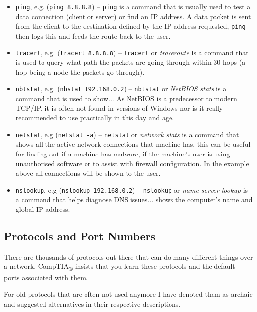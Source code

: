 \documentclass{article}
\begin{document}
\begin{itemize}
    \item \texttt{ping}, e.g. (\texttt{ping 8.8.8.8}) -- \texttt{ping} is a command that is usually used to test a data connection (client or server) or find an IP address. A data packet is sent from the client to the destination defined by the IP address requested, \texttt{ping} then logs this and feeds the route back to the user.
    \item \texttt{tracert}, e.g. (\texttt{tracert 8.8.8.8}) -- \texttt{tracert} or \textit{traceroute} is a command that is used to query what path the packets are going through within 30 hops (a hop being a node the packets go through).
    \item \texttt{nbtstat}, e.g. (\texttt{nbstat 192.168.0.2}) -- \texttt{nbtstat} or \textit{NetBIOS stats} is a command that is used to show... As NetBIOS is a predecessor to modern TCP/IP, it is often not found in versions of Windows nor is it really recommended to use practically in this day and age.
    \item \texttt{netstat}, e.g (\texttt{netstat -a}) -- \texttt{netstat} or \textit{network stats} is a command that shows all the active network connections that machine has, this can be useful for finding out if a machine has malware, if the machine's user is using unauthorised software or to assist with firewall configuration. In the example above all connections will be shown to the user.
    \item \texttt{nslookup}, e.g (\texttt{nslookup 192.168.0.2}) -- \texttt{nslookup} or \textit{name server lookup} is a command that helps diagnose DNS issues... shows the computer's name and global IP address.
\end{itemize}

\subsection{Protocols and Port Numbers}


There are thousands of protocols out there that can do many different things over a network. CompTIA\textsubscript{®} insists that you learn these protocols and the default ports associated with them.

For old protocols that are often not used anymore I have denoted them as archaic and suggested alternatives in their respective descriptions.
\end{document}
